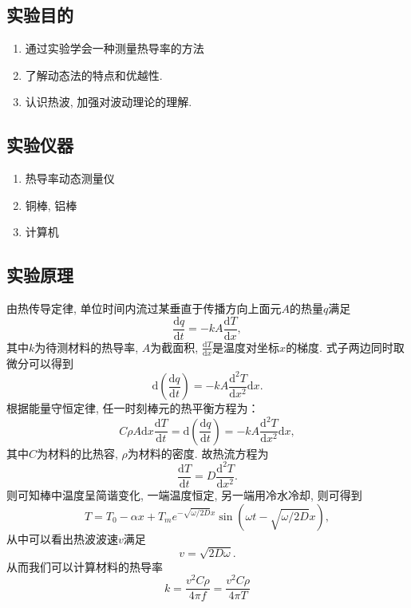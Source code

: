 \documentclass[zihao=5, UTF8]{article}
\renewcommand{\dd}{\mathrm{d}}
\theoremstyle{MyLineTheoremStyle} %
\theoremstyle{MyBlockTheoremStyle} %
\theoremstyle{MySubsubsectionStyle} %
\begin{document}
\subsection{实验目的}
\begin{enumerate}
    \item 通过实验学会一种测量热导率的方法
    \item 了解动态法的特点和优越性. 
    \item 认识热波, 加强对波动理论的理解. 
\end{enumerate}
\subsection{实验仪器}
\begin{enumerate}
    \item 热导率动态测量仪
    \item 铜棒, 铝棒
    \item 计算机
\end{enumerate}
\subsection{实验原理}
由热传导定律, 单位时间内流过某垂直于传播方向上面元$A$的热量$q$满足
\begin{equation}
    \frac{\dd q}{\dd t} = -kA \frac{\dd T}{\dd x},
\end{equation}
其中$k$为待测材料的热导率, $A$为截面积, $\frac{\dd T}{\dd x}$是温度对坐标$x$的梯度. 式子两边同时取微分可以得到
\begin{equation}
    \dd\left(\frac{\dd q}{\dd t}\right) = -kA \frac{\dd^2T}{\dd x^2} \dd x.
\end{equation}
根据能量守恒定律, 任一时刻棒元的热平衡方程为：
\begin{equation}
    C\rho A \dd x \frac{\dd T}{\dd t} = \dd\left(\frac{\dd q}{\dd t}\right) = -kA \frac{\dd^2T}{\dd x^2} \dd x,
\end{equation}
其中$C$为材料的比热容, $\rho$为材料的密度. 故热流方程为
\begin{equation}
    \frac{\dd T}{\dd t} = D \frac{\dd^2 T}{\dd x^2}.
\end{equation}
则可知棒中温度呈简谐变化, 一端温度恒定, 另一端用冷水冷却, 则可得到
\begin{equation}
    T = T_0 - \alpha x + T_m e^{-\sqrt{\omega / 2D} x} \sin(\omega t - \sqrt{\omega / 2D} x),
\end{equation}
从中可以看出热波波速$v$满足
\begin{equation}
    v = \sqrt{2D\omega}.
\end{equation}
从而我们可以计算材料的热导率
\begin{equation}
    k = \frac{v^2 C \rho}{4\pi f} = \frac{v^2 C \rho}{4\pi T}
\end{equation}
\end{document}

